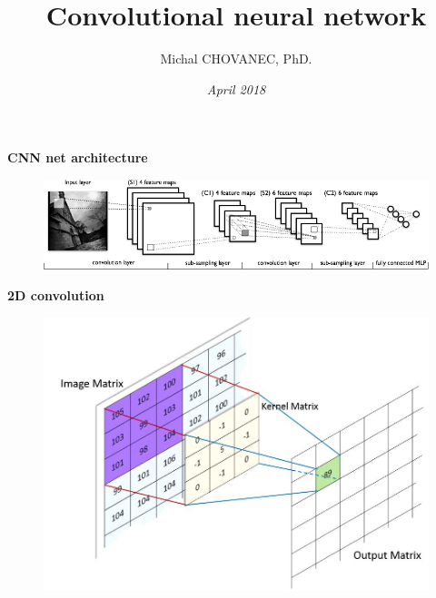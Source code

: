 \documentclass[xcolor=dvipsnames]{beamer}
\title{\bf Convolutional neural network}
\author{Michal CHOVANEC, PhD.}
\date[EURP]{\it April 2018}
\begin{document}
\begin{frame}
\titlepage
{}
\end{frame}


\begin{frame}{\bf CNN net architecture}

\begin{figure}
\centering
\includegraphics[scale=0.5]{convnet.png}
\end{figure}

\end{frame}

\begin{frame}{\bf 2D convolution}

\begin{figure}
\centering
\includegraphics[scale=0.3]{conv_01.jpg}
\end{figure}

\end{frame}
\end{document}

